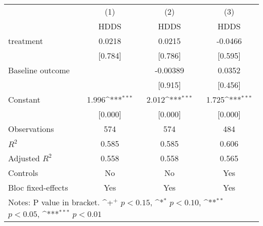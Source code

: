 {
\def\sym#1{\ifmmode^{#1}\else\(^{#1}\)\fi}
\begin{tabular*}{1.2\hsize}{@{\hskip\tabcolsep\extracolsep\fill}l*{3}{c}}
\cline{1-4}\cline{1-4}
     &\multicolumn{1}{c}{(1)}&\multicolumn{1}{c}{(2)}&\multicolumn{1}{c}{(3)}\\
     &\multicolumn{1}{c}{HDDS}&\multicolumn{1}{c}{HDDS}&\multicolumn{1}{c}{HDDS}\\
\cline{1-4}
treatment&0.0218         &0.0215         &-0.0466         \\
     &[0.784]         &[0.786]         &[0.595]         \\
[1em]
Baseline outcome&           &-0.00389         &0.0352         \\
     &           &[0.915]         &[0.456]         \\
[1em]
Constant&1.996\sym{***}&2.012\sym{***}&1.725\sym{***}\\
     &[0.000]         &[0.000]         &[0.000]         \\
\cline{1-4}
Observations&574         &574         &484         \\
\(R^{2}\)&0.585         &0.585         &0.606         \\
Adjusted \(R^{2}\)&0.558         &0.558         &0.565         \\
Controls&No         &No         &Yes         \\
Bloc fixed-effects&Yes         &Yes         &Yes         \\
\cline{1-4}\cline{1-4}
\multicolumn{4}{p{1.0\textwidth}}{\footnotesize Notes: P value in bracket. \sym{+} \(p<0.15\), \sym{*} \(p<0.10\), \sym{**} \(p<0.05\), \sym{***} \(p<0.01\)}\\
\end{tabular*}
}
